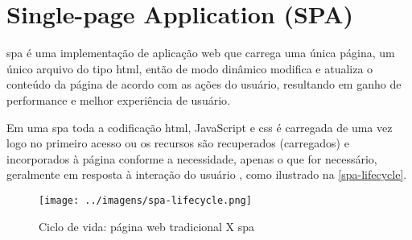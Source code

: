 \section{Single-page Application (SPA)}
\Gls{spa} é uma implementação de aplicação web que carrega uma única página, um único arquivo do tipo \ac{html}, então de modo dinâmico modifica e atualiza o conteúdo da página de acordo com as ações do usuário, resultando em ganho de performance e melhor experiência de usuário. \cite{spamozilla}

Em uma \ac{spa} toda a codificação \ac{html}, JavaScript e \acs{css} é carregada de uma vez logo no primeiro acesso ou os recursos são recuperados (carregados) e incorporados à página conforme a necessidade, apenas o que for necessário, geralmente em resposta à interação do usuário \cite{wikispa}, como ilustrado na \autoref{spa-lifecycle}.

\begin{figure}[H]
	\centering
	\caption{\label{spa-lifecycle}Ciclo de vida: página web tradicional X \acs{spa}}
	\texttt{[image: ../imagens/spa-lifecycle.png]}
\end{figure}